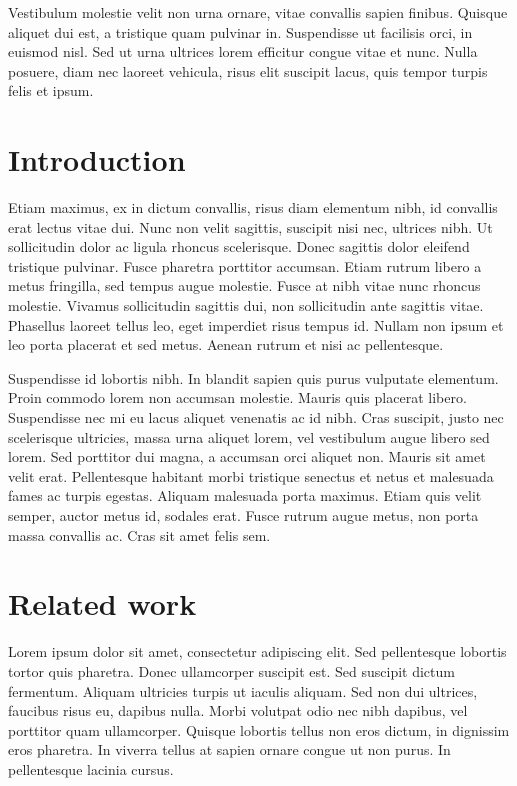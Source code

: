 \documentclass[8pt]{article}
\begin{document}
Vestibulum molestie velit non urna ornare, vitae convallis sapien finibus. Quisque aliquet dui est, a tristique quam pulvinar in. Suspendisse ut facilisis orci, in euismod nisl. Sed ut urna ultrices lorem efficitur congue vitae et nunc. Nulla posuere, diam nec laoreet vehicula, risus elit suscipit lacus, quis tempor turpis felis et ipsum.
\begin{multicols}{2}
\section{Introduction}
Etiam maximus, ex in dictum convallis, risus diam elementum nibh, id convallis erat lectus vitae dui. Nunc non velit sagittis, suscipit nisi nec, ultrices nibh. Ut sollicitudin dolor ac ligula rhoncus scelerisque. Donec sagittis dolor eleifend tristique pulvinar. Fusce pharetra porttitor accumsan. Etiam rutrum libero a metus fringilla, sed tempus augue molestie. Fusce at nibh vitae nunc rhoncus molestie. Vivamus sollicitudin sagittis dui, non sollicitudin ante sagittis vitae. Phasellus laoreet tellus leo, eget imperdiet risus tempus id. Nullam non ipsum et leo porta placerat et sed metus. Aenean rutrum et nisi ac pellentesque.

Suspendisse id lobortis nibh. In blandit sapien quis purus vulputate elementum. Proin commodo lorem non accumsan molestie. Mauris quis placerat libero. Suspendisse nec mi eu lacus aliquet venenatis ac id nibh. Cras suscipit, justo nec scelerisque ultricies, massa urna aliquet lorem, vel vestibulum augue libero sed lorem. Sed porttitor dui magna, a accumsan orci aliquet non. Mauris sit amet velit erat. Pellentesque habitant morbi tristique senectus et netus et malesuada fames ac turpis egestas. Aliquam malesuada porta maximus. Etiam quis velit semper, auctor metus id, sodales erat. Fusce rutrum augue metus, non porta massa convallis ac. Cras sit amet felis sem.
\section{Related work}
Lorem ipsum dolor sit amet, consectetur adipiscing elit. Sed pellentesque lobortis tortor quis pharetra. Donec ullamcorper suscipit est. Sed suscipit dictum fermentum. Aliquam ultricies turpis ut iaculis aliquam. Sed non dui ultrices, faucibus risus eu, dapibus nulla. Morbi volutpat odio nec nibh dapibus, vel porttitor quam ullamcorper. Quisque lobortis tellus non eros dictum, in dignissim eros pharetra. In viverra tellus at sapien ornare congue ut non purus. In pellentesque lacinia cursus.


\end{multicols}
\end{document}
